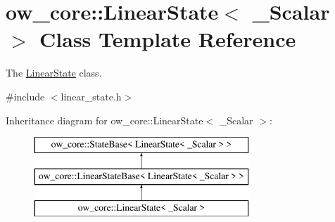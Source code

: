 \hypertarget{classow__core_1_1LinearState}{}\section{ow\+\_\+core\+:\+:Linear\+State$<$ \+\_\+\+Scalar $>$ Class Template Reference}
\label{classow__core_1_1LinearState}


The \hyperlink{classow__core_1_1LinearState}{Linear\+State} class.  




{\ttfamily \#include $<$linear\+\_\+state.\+h$>$}

Inheritance diagram for ow\+\_\+core\+:\+:Linear\+State$<$ \+\_\+\+Scalar $>$\+:\begin{figure}[H]
\begin{center}
\leavevmode
\includegraphics[height=3.000000cm]{d0/de6/classow__core_1_1LinearState}
\end{center}
\end{figure}
